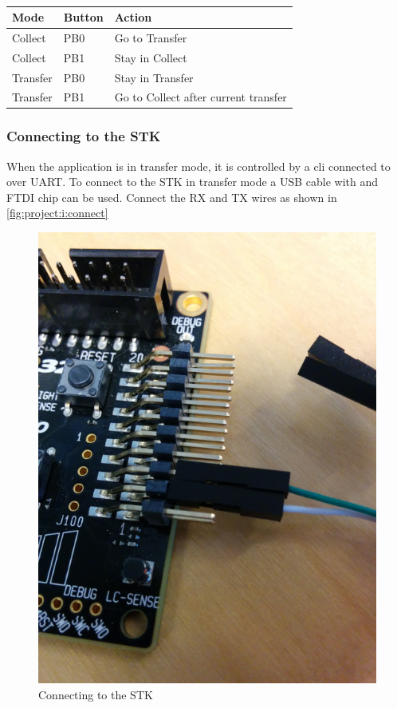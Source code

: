 \begin{table}[H]
  \centering
  \begin{tabular}{|l|l|l|}
    \hline
    Mode & Button & Action \\
    \hline \hline
    Collect & PB0 & Go to Transfer \\
    \hline
    Collect & PB1 & Stay in Collect \\
    \hline
    Transfer & PB0 & Stay in Transfer \\
    \hline
    Transfer & PB1 & Go to Collect after current transfer \\
    \hline
  \end{tabular}
  \caption{}
  \label{tab:project:i:buttons}
\end{table}

\subsubsection{Connecting to the STK}
When the application is in transfer mode, it is controlled by a \gls{cli} connected to over UART.
To connect to the STK in transfer mode a USB cable with and FTDI chip can be used.
Connect the RX and TX wires as shown in \autoref{fig:project:i:connect}

\begin{figure}[H]
  \begin{center}
    \includegraphics[scale=0.5]{figures/project-i-connect.png}
  \end{center}
  \caption{Connecting to the STK}
  \label{fig:project:i:connect}
\end{figure}

